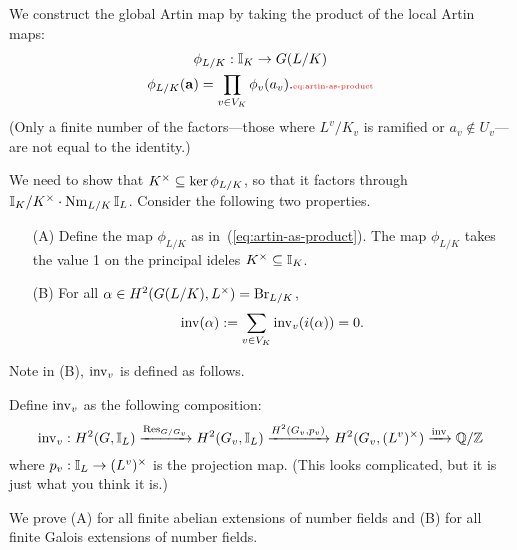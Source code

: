 We construct the global Artin map by taking the product of the local Artin maps:
\begin{gather}
\nonumber\phi_{L/K}:\I_K\to G(L/K)\\
\phi_{L/K}(\mathbf a)=\prod_{v\in V_K}\phi_v(a_v).\llabel{eq:artin-as-product}
\end{gather}
(Only a finite number of the factors---those where $L^v/K_v$ is ramified or $a_v\nin U_v$---are not equal to the identity.)

We need to show that $K^{\times}\subseteq \ker \phi_{L/K}$, so that it factors through $\mathbb{I}_K/K^{\times} \cdot \operatorname{Nm}_{L/K}\mathbb{I}_L$.
Consider the following two properties.
\begin{enumerate}
\item[(A)]
Define the map $\phi_{L/K}$ as in~(\ref{eq:artin-as-product}). 
The map $\phi_{L/K}$ takes the value 1 on the principal ideles $K^{\times}\subseteq \mathbb{I}_K$.
\item[(B)]
For all $\alpha\in H^2(G(L/K),L^{\times})=\operatorname{Br}_{L/K}$,
\[
\operatorname{inv}(\alpha):=\sum_{v\in V_K} \operatorname{inv}_v(i(\alpha))=0.
\]
\end{enumerate}
Note in (B), $\operatorname{inv}_v$ is defined as follows.
\begin{df}
Define $\operatorname{inv}_v$ as the following composition: %
\[
\operatorname{inv}_v:H^2(G,\mathbb{I}_L)\xrightarrow{\operatorname{Res}_{G/{G_v}}} H^2(G_v,\mathbb{I}_L) \xrightarrow{H^2(G_v,p_v)} H^2(G_v,(L^v)^{\times})\xrightarrow{\operatorname{inv}}\mathbb{Q}/\mathbb{Z}
\]
where $p_v:\mathbb{I}_L\to (L^v)^{\times}$ is the projection map. (This looks complicated, but it is just what you think it is.)
\end{df}

We prove (A) for all finite abelian extensions of number fields and (B) for all finite Galois extensions of number fields.

